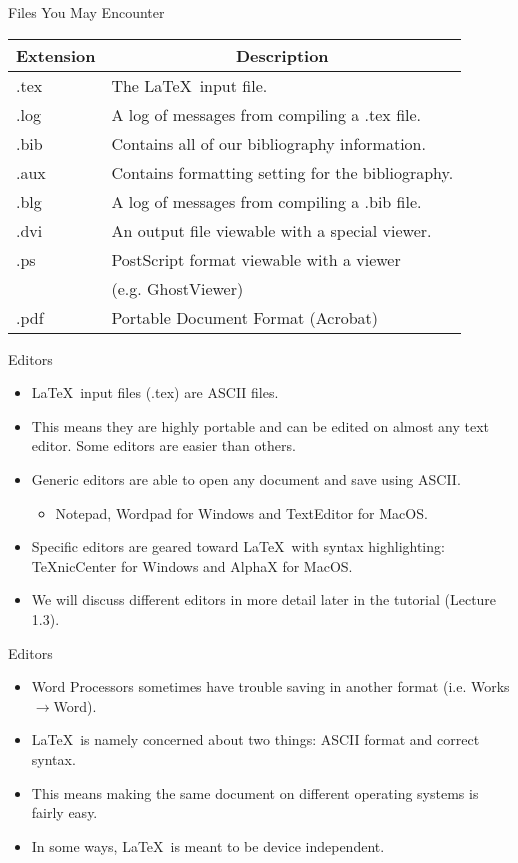 \documentclass[pdf]{prosper}
\begin{document}
\begin{slide}{Files You May Encounter}
	\begin{tabular}{l l}
			\hline
			\multicolumn{1}{c}{Extension}							&	\multicolumn{1}{c}{Description} \\
			\hline
			.tex	&	The \LaTeX\ input file. \\
			.log			&	A log of messages from compiling a .tex file. \\
			.bib		&	Contains all of our bibliography information. \\
			.aux		& Contains formatting setting for the bibliography. \\
			.blg		& A log of messages from compiling a .bib file. \\
			.dvi		&	An output file viewable with a special viewer. \\
			.ps			& PostScript format viewable with a viewer \\
							& (e.g. GhostViewer) \\
			.pdf		& Portable Document Format (Acrobat) \\
			\hline
	\end{tabular}
\end{slide}
\begin{slide}{Editors}
	\begin{itemize}
		\item \LaTeX\ input files (.tex) are ASCII files.
		\item This means they are highly portable and can be edited on almost any text editor. Some editors are easier than others.
		\item Generic editors are able to open any document and save using ASCII.
			\begin{itemize}
				\item Notepad, Wordpad for Windows and TextEditor for MacOS.
			\end{itemize}
		\item Specific editors are geared toward \LaTeX\ with syntax highlighting: TeXnicCenter for Windows and AlphaX for MacOS.
		\item We will discuss different editors in more detail later in the tutorial (Lecture 1.3).
	\end{itemize}
\end{slide}
\begin{slide}{Editors}
	\begin{itemize}
		\item Word Processors sometimes have trouble saving in another format (i.e. Works$\rightarrow$Word).
		\item \LaTeX\ is namely concerned about two things: ASCII format and correct syntax.
		\item This means making the same document on different operating systems is fairly easy.
		\item In some ways, \LaTeX\ is meant to be device independent.
	\end{itemize}
\end{slide}
\end{document}
